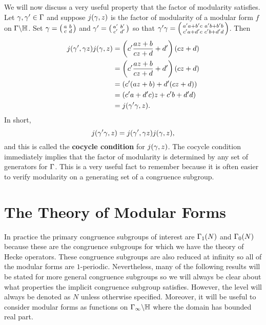       We will now discuss a very useful property that the factor of modularity satisfies. Let $\gamma,\gamma' \in \Gamma$ and suppose $j(\gamma,z)$ is the factor of modularity of a modular form $f$ on $\Gamma\backslash\mathbb{H}$. Set $\gamma = \begin{psmallmatrix} a & b \\ c & d \end{psmallmatrix}$ and $\gamma' = \begin{psmallmatrix} a' & b' \\ c' & d' \end{psmallmatrix}$ so that $\gamma'\gamma = \begin{psmallmatrix} a'a+b'c & a'b+b'b \\ c'a+d'c & c'b+d'd \end{psmallmatrix}$. Then
      \begin{align*}
        j(\gamma',\gamma z)j(\gamma,z) &= \left(c'\frac{az+b}{cz+d}+d'\right)(cz+d) \\
        &= \left(c'\frac{az+b}{cz+d}+d'\right)(cz+d) \\
        &= (c'(az+b)+d'(cz+d)) \\
        &= (c'a+d'c)z+c'b+d'd) \\
        &= j(\gamma'\gamma,z).
      \end{align*}
      In short,
      \[
        j(\gamma'\gamma,z) =  j(\gamma',\gamma z)j(\gamma,z),
      \]
      and this is called the \textbf{cocycle condition} for $j(\gamma,z)$. The cocycle condition immediately implies that the factor of modularity is determined by any set of generators for $\Gamma$. This is a very useful fact to remember because it is often easier to verify modularity on a generating set of a congruence subgroup.
  \section{The Theory of Modular Forms}\label{sec:The_Theory_of_Modular_Forms}
    In practice the primary congruence subgroups of interest are $\Gamma_{1}(N)$ and $\Gamma_{0}(N)$ because these are the congruence subgroups for which we have the theory of Hecke operators. These congruence subgroups are also reduced at infinity so all of the modular forms are $1$-periodic. Nevertheless, many of the following results will be stated for more general congruence subgroups so we will always be clear about what properties the implicit congruence subgroup satisfies. However, the level will always be denoted as $N$ unless otherwise specified. Moreover, it will be useful to consider modular forms as functions on $\Gamma_{\infty}\backslash\mathbb{H}$ where the domain has bounded real part.
